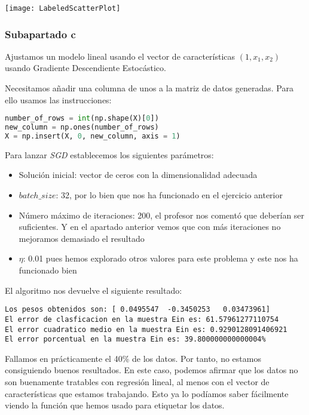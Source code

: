 \documentclass[11pt]{article}
\begin{document}
\texttt{[image: LabeledScatterPlot]}

\subsubsection{Subapartado c}

Ajustamos un modelo lineal usando el vector de características $(1, x_1, x_2)$ usando Gradiente Descendiente Estocástico.

Necesitamos añadir una columna de unos a la matriz de datos generadas. Para ello usamos las instrucciones:

\begin{lstlisting}[language=Python]
number_of_rows = int(np.shape(X)[0])
new_column = np.ones(number_of_rows)
X = np.insert(X, 0, new_column, axis = 1)
\end{lstlisting}

Para lanzar \emph{SGD} establecemos los siguientes parámetros:

\begin{itemize}
    \item Solución inicial: vector de ceros con la dimensionalidad adecuada
    \item $batch\_size$: 32, por lo bien que nos ha funcionado en el ejercicio anterior
    \item Número máximo de iteraciones: 200, el profesor nos comentó que deberían ser suficientes. Y en el apartado anterior vemos que con más iteraciones no mejoramos demasiado el resultado
    \item $\eta$: 0.01 pues hemos explorado otros valores para este problema y este nos ha funcionado bien
\end{itemize}

El algoritmo nos devuelve el siguiente resultado:

\begin{lstlisting}
Los pesos obtenidos son: [ 0.0495547  -0.3450253   0.03473961]
El error de clasficacion en la muestra Ein es: 61.57961277110754
El error cuadratico medio en la muestra Ein es: 0.9290128091406921
El error porcentual en la muestra Ein es: 39.800000000000004%
\end{lstlisting}

Fallamos en prácticamente el 40\% de los datos. Por tanto, no estamos consiguiendo buenos resultados. En este caso, podemos afirmar que los datos no son buenamente tratables con regresión lineal, al menos con el vector de características que estamos trabajando. Esto ya lo podíamos saber fácilmente viendo la función que hemos usado para etiquetar los datos.
\end{document}
